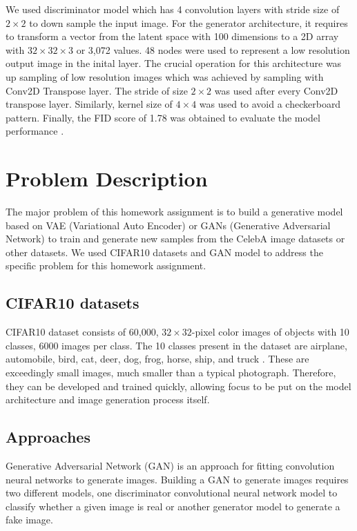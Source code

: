 \documentclass{article}
\begin{document}
We used discriminator model which has 4 convolution layers with stride size of $2\times2$ to down sample the input image. For the generator architecture, it requires to transform a vector from the latent space with 100 dimensions to a 2D array with $32\times32\times3$ or 3,072 values. 48 nodes were used to represent a low resolution output image in the inital layer. The crucial operation for this architecture was up sampling of low resolution images which was achieved by sampling with Conv2D Transpose layer. The stride of size $2\times2$ was used after every Conv2D transpose layer. Similarly, kernel size of $4\times4$ was used to avoid a checkerboard pattern. Finally, the FID score of 1.78 was obtained to evaluate the model performance \cite{Jason}. 


\section{Problem Description}
The major problem of this homework assignment is to build a generative model based on VAE (Variational Auto Encoder) or GANs (Generative Adversarial Network) to train and generate new samples from the CelebA image datasets or other datasets. We used CIFAR10 datasets and GAN model to address the specific problem for this homework assignment.  

\subsection{CIFAR10 datasets}
CIFAR10 dataset consists of 60,000, $32\times32$-pixel color images of objects with 10 classes, 6000 images per class. The 10 classes present in the dataset are airplane, automobile, bird, cat, deer, dog, frog, horse, ship, and truck \cite{kaggle}. These are exceedingly small images, much smaller than a typical photograph. Therefore, they can be developed and trained quickly, allowing focus to be put on the model architecture and image generation process itself.  

\subsection{Approaches}
Generative Adversarial Network (GAN) is an approach for fitting convolution neural networks to generate images. 
Building a GAN to generate images requires two different models, one discriminator convolutional neural network model to classify whether a given image is real or another generator model to generate a fake image. 
\end{document}
